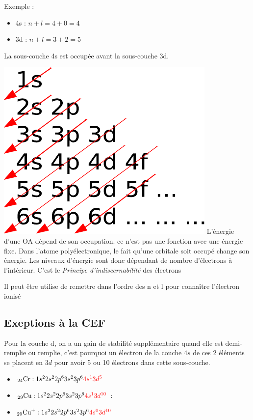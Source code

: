 \documentclass[french]{yLectureNote}
\begin{document}
Exemple :
\begin{itemize}
 \item 4s : $n + l = 4 + 0 = 4$
\item 3d : $n + l = 3 + 2 = 5$
\end{itemize}
La sous-couche 4s est occupée avant la sous-couche 3d.

\begin{multicols}{2}
\includegraphics[scale=0.5]{rule}
 \columnbreak
 L'énergie d'une OA dépend de son occupation. ce n'est pas une fonction avec une énergie fixe. Dans l'atome polyélectronique, le fait qu'une orbitale soit occupé change son énergie. Les niveaux d'énergie sont donc dépendant de nombre d'électrons à l'intérieur. C'est le \emph{Principe d'indiscernabilité} des électrons
\end{multicols}

Il peut \^etre utilise de remettre dans l'ordre des n et l pour conna\^itre l'électron ionisé
\subsection{Exeptions à la CEF}
Pour la couche d, on a un gain de stabilité supplémentaire quand elle est demi-remplie ou remplie, c'est pourquoi un électron de la couche $4s$ de ces 2 éléments se placent en $3d$ pour avoir 5 ou 10 électrons dans cette sous-couche.
\begin{itemize}
 \item $_{24}\text{Cr} : 1s^22s^22p^63s^23p^6{\color{red}4s^13d^5}$
 \item $_{29}\text{Cu} : 1s^22s^22p^63s^23p^6{\color{red}4s^13d^{10}}$ :
 \item $_{29}\text{Cu}^+ : 1s^22s^22p^63s^23p^6{\color{red}4s^03d^{10}}$
\end{itemize}
\end{document}
